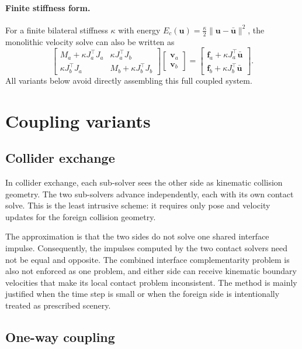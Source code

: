 \documentclass[11pt]{article}
\newcommand{\va}{\bm v_a}
\newcommand{\vb}{\bm v_b}
\newcommand{\uu}{\bm u}
\newcommand{\ubar}{\bar{\bm u}}
\newcommand{\fa}{\bm f_a}
\newcommand{\fb}{\bm f_b}
\newcommand{\Ja}{J_a}
\newcommand{\Jb}{J_b}
\newcommand{\Ma}{M_a}
\newcommand{\Mb}{M_b}
\begin{document}
\paragraph{Finite stiffness form.}
For a finite bilateral stiffness $\kappa$ with energy
$E_c(\uu)=\frac{\kappa}{2}\|\uu-\ubar\|^2$, the monolithic velocity solve can also be
written as
\begin{equation}
\begin{bmatrix}
\Ma + \kappa\Ja^\top\Ja & \kappa\Ja^\top\Jb \\
\kappa\Jb^\top\Ja & \Mb + \kappa\Jb^\top\Jb
\end{bmatrix}
\begin{bmatrix}
\va \\ \vb
\end{bmatrix}
=
\begin{bmatrix}
\fa + \kappa\Ja^\top\ubar \\
\fb + \kappa\Jb^\top\ubar
\end{bmatrix}.
\label{eq:stiffness}
\end{equation}
All variants below avoid directly assembling this full coupled system.

\section{Coupling variants}

\subsection{Collider exchange}

In collider exchange, each sub-solver sees the other side as kinematic collision
geometry. The two sub-solvers advance independently, each with its own contact solve.
This is the least intrusive scheme: it requires only pose and velocity updates for the
foreign collision geometry.

The approximation is that the two sides do not solve one shared interface impulse.
Consequently, the impulses computed by the two contact solvers need not be equal and
opposite. The combined interface complementarity problem is also not enforced as one
problem, and either side can receive kinematic boundary velocities that make its local
contact problem inconsistent. The method is mainly justified when the time step is
small or when the foreign side is intentionally treated as prescribed scenery.

\subsection{One-way coupling}
\end{document}
